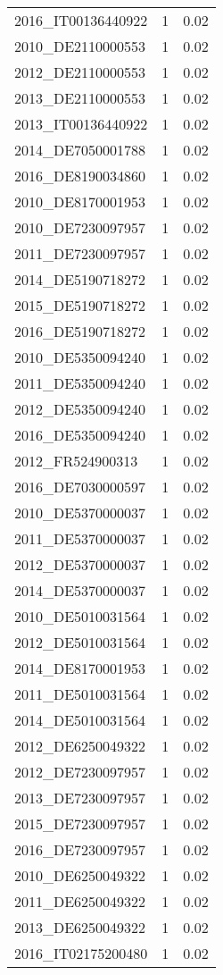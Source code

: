 \begin{table*}[htbp]
\begin{tabular}{lrr}
2016_IT00136440922 & 1 & 0.02 \\
2010_DE2110000553 & 1 & 0.02 \\
2012_DE2110000553 & 1 & 0.02 \\
2013_DE2110000553 & 1 & 0.02 \\
2013_IT00136440922 & 1 & 0.02 \\
2014_DE7050001788 & 1 & 0.02 \\
2016_DE8190034860 & 1 & 0.02 \\
2010_DE8170001953 & 1 & 0.02 \\
2010_DE7230097957 & 1 & 0.02 \\
2011_DE7230097957 & 1 & 0.02 \\
2014_DE5190718272 & 1 & 0.02 \\
2015_DE5190718272 & 1 & 0.02 \\
2016_DE5190718272 & 1 & 0.02 \\
2010_DE5350094240 & 1 & 0.02 \\
2011_DE5350094240 & 1 & 0.02 \\
2012_DE5350094240 & 1 & 0.02 \\
2016_DE5350094240 & 1 & 0.02 \\
2012_FR524900313 & 1 & 0.02 \\
2016_DE7030000597 & 1 & 0.02 \\
2010_DE5370000037 & 1 & 0.02 \\
2011_DE5370000037 & 1 & 0.02 \\
2012_DE5370000037 & 1 & 0.02 \\
2014_DE5370000037 & 1 & 0.02 \\
2010_DE5010031564 & 1 & 0.02 \\
2012_DE5010031564 & 1 & 0.02 \\
2014_DE8170001953 & 1 & 0.02 \\
2011_DE5010031564 & 1 & 0.02 \\
2014_DE5010031564 & 1 & 0.02 \\
2012_DE6250049322 & 1 & 0.02 \\
2012_DE7230097957 & 1 & 0.02 \\
2013_DE7230097957 & 1 & 0.02 \\
2015_DE7230097957 & 1 & 0.02 \\
2016_DE7230097957 & 1 & 0.02 \\
2010_DE6250049322 & 1 & 0.02 \\
2011_DE6250049322 & 1 & 0.02 \\
2013_DE6250049322 & 1 & 0.02 \\
2016_IT02175200480 & 1 & 0.02 \\

\end{tabular}
\end{table*}
